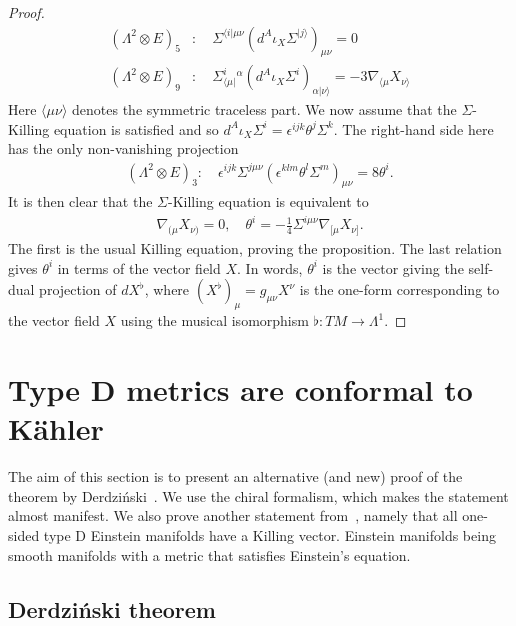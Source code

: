 \documentclass[10pt]{report}
\newcommand{\derd}[0]{Derdzi\'nski}
\theoremstyle{definition}
\begin{document}
\begin{proof}
\begin{align}
    (\Lambda^2 \otimes E)_5&: \quad \Sigma^{\langle i | \mu \nu} (d^A \iota_X \Sigma^{|j\rangle})_{\mu \nu} = 0 \nonumber\\
    (\Lambda^2 \otimes E)_9&: \quad \Sigma^i_{\langle \mu|}{}^\alpha (d^A \iota_X \Sigma^i)_{\alpha | \nu \rangle} = -3 \nabla_{\langle \mu} X_{\nu \rangle} \nonumber
\end{align}
Here $\langle \mu \nu \rangle$ denotes the symmetric traceless part.
We now assume that the $\Sigma$-Killing equation is satisfied and so $d^A \iota_X \Sigma^i= \epsilon^{ijk} \theta^j \Sigma^k$. The right-hand side here has the only non-vanishing projection 
\begin{align}
    (\Lambda^2 \otimes E)_3: \quad \epsilon^{ijk} \Sigma^{j\mu\nu} (\epsilon^{klm} \theta^l \Sigma^m)_{\mu\nu} = 8 \theta^i.
\end{align}
It is then clear that the $\Sigma$-Killing equation is equivalent to 
\begin{align}
    \nabla_{(\mu} X_{\nu)} = 0, \quad \theta^i = -\frac{1}{4}\Sigma^{i\mu\nu} \nabla_{[\mu} X_{\nu]}.
\end{align}
The first is the usual Killing equation, proving the proposition. The last relation gives $\theta^i$ in terms of the vector field $X$. In words, $\theta^i$ is the vector giving the self-dual projection of $dX^\flat$, where $(X^\flat)_\mu = g_{\mu\nu} X^\nu$ is the one-form corresponding to the vector field $X$ using the musical isomorphism $\flat : TM \rightarrow \Lambda^1$. 
\end{proof}

\section{Type D metrics are conformal to K\"ahler}\label{sec:ConformalToKahler}

The aim of this section is to present an alternative (and new) proof of the theorem by \derd{}~\cite{SelfDualKahleDerdzi1983}. We use the chiral formalism, which makes the statement almost manifest. We also prove another statement from~\cite{SelfDualKahleDerdzi1983}, namely that all one-sided type D Einstein manifolds have a Killing vector. Einstein manifolds being smooth manifolds with a metric that satisfies Einstein's equation.

\subsection{\derd{} theorem}
\end{document}

